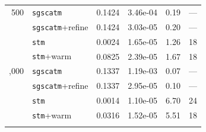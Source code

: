 \begin{table}[t]
\begin{tabular}{rlcccc}
\midrule
500 & \texttt{sgscatm} & 0.1424 & 3.46e-04 & 0.19 & --- \\
 & \texttt{sgscatm}+refine & 0.1424 & 3.03e-05 & 0.20 & --- \\
 & \texttt{stm} & 0.0024 & 1.65e-05 & 1.26 & 18 \\
 & \texttt{stm}+warm & 0.0825 & 2.39e-05 & 1.67 & 18 \\
\addlinespace
2,000 & \texttt{sgscatm} & 0.1337 & 1.19e-03 & 0.07 & --- \\
 & \texttt{sgscatm}+refine & 0.1337 & 2.95e-05 & 0.10 & --- \\
 & \texttt{stm} & 0.0014 & 1.10e-05 & 6.70 & 24 \\
 & \texttt{stm}+warm & 0.0316 & 1.52e-05 & 5.51 & 18 \\
\addlinespace
\bottomrule
\end{tabular}
\end{table}

